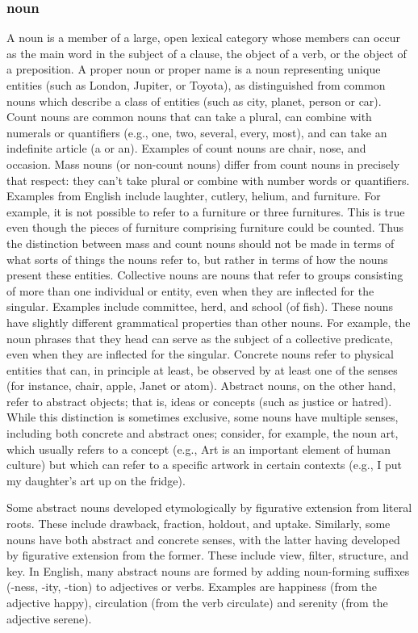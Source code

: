 \begin{small}
\subsubsection{noun}
A noun is a member of a large, open lexical category whose members can occur as the main word in the subject of a clause, the object of a verb, or the object of a preposition.  A proper noun or proper name is a noun representing unique entities (such as London, Jupiter, or Toyota), as distinguished from common nouns which describe a class of entities (such as city, planet, person or car).  Count nouns are common nouns that can take a plural, can combine with numerals or quantifiers (e.g., one, two, several, every, most), and can take an indefinite article (a or an). Examples of count nouns are chair, nose, and occasion.
Mass nouns (or non-count nouns) differ from count nouns in precisely that respect: they can't take plural or combine with number words or quantifiers. Examples from English include laughter, cutlery, helium, and furniture. For example, it is not possible to refer to a furniture or three furnitures. This is true even though the pieces of furniture comprising furniture could be counted. Thus the distinction between mass and count nouns should not be made in terms of what sorts of things the nouns refer to, but rather in terms of how the nouns present these entities.  Collective nouns are nouns that refer to groups consisting of more than one individual or entity, even when they are inflected for the singular. Examples include committee, herd, and school (of fish). These nouns have slightly different grammatical properties than other nouns. For example, the noun phrases that they head can serve as the subject of a collective predicate, even when they are inflected for the singular.  Concrete nouns refer to physical entities that can, in principle at least, be observed by at least one of the senses (for instance, chair, apple, Janet or atom). Abstract nouns, on the other hand, refer to abstract objects; that is, ideas or concepts (such as justice or hatred). While this distinction is sometimes exclusive, some nouns have multiple senses, including both concrete and abstract ones; consider, for example, the noun art, which usually refers to a concept (e.g., Art is an important element of human culture) but which can refer to a specific artwork in certain contexts (e.g., I put my daughter's art up on the fridge).

Some abstract nouns developed etymologically by figurative extension from literal roots. These include drawback, fraction, holdout, and uptake. Similarly, some nouns have both abstract and concrete senses, with the latter having developed by figurative extension from the former. These include view, filter, structure, and key.  In English, many abstract nouns are formed by adding noun-forming suffixes (-ness, -ity, -tion) to adjectives or verbs. Examples are happiness (from the adjective happy), circulation (from the verb circulate) and serenity (from the adjective serene).


\end{small}
